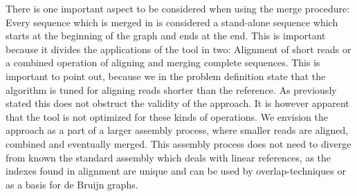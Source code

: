 \documentclass[thesis.tex]{subfiles}
\begin{document}
\par\noindent
There is one important aspect to be considered when using the merge procedure: Every sequence which is merged in is considered a stand-alone sequence which starts at the beginning of the graph and ends at the end. This is important because it divides the applications of the tool in two: Alignment of short reads or a combined operation of aligning and merging complete sequences. This is important to point out, because we in the problem definition state that the algorithm is tuned for aligning reads shorter than the reference. As previously stated this does not obstruct the validity of the approach. It is however apparent that the tool is not optimized for these kinds of operations. We envision the approach as a part of a larger assembly process, where smaller reads are aligned, combined and eventually merged. This assembly process does not need to diverge from known the standard assembly which deals with linear references, as the indexes found in alignment are unique and can be used by overlap-techniques or as a basis for de Bruijn graphs.
\end{document}
